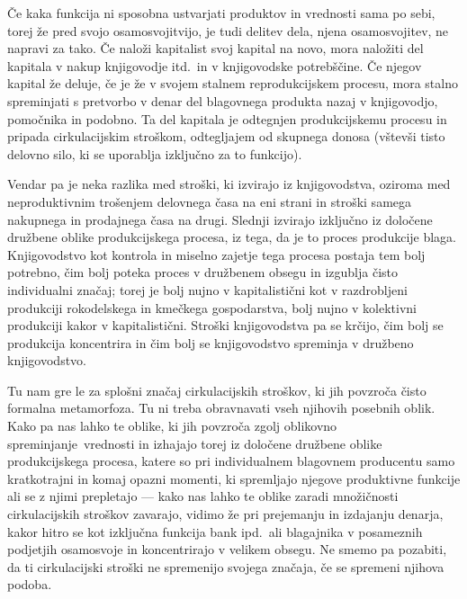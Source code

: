 \documentclass[kapital_02.tex]{subfiles}
\begin{document}
Če kaka funkcija ni sposobna ustvarjati produktov in vrednosti sama po sebi, torej že pred svojo osamosvojitvijo, je tudi delitev dela, njena osamosvojitev, ne napravi za tako.
Če naloži kapitalist svoj kapital na novo, mora naložiti del kapitala v nakup knjigovodje itd.\ in v knjigovodske potrebščine.
Če njegov kapital že deluje, če je že v svojem stalnem reprodukcijskem procesu, mora stalno spreminjati s pretvorbo v denar del blagovnega produkta nazaj v knjigovodjo, pomočnika in podobno.
Ta del kapitala je odtegnjen produkcijskemu procesu in pripada cirkulacijskim stroškom, odtegljajem od skupnega donosa (vštevši tisto delovno silo, ki se uporablja izključno za to funkcijo).

Vendar pa je neka razlika med stroški, ki izvirajo iz knjigovodstva, oziroma med neproduktivnim trošenjem delovnega časa na eni strani in stroški samega nakupnega in prodajnega časa na drugi.
Slednji izvirajo izključno iz določene družbene oblike produkcijskega procesa, iz tega, da je to proces produkcije blaga.
Knjigovodstvo kot kontrola in miselno zajetje tega procesa postaja tem bolj potrebno, čim bolj poteka proces v družbenem obsegu in izgublja čisto individualni značaj; torej je bolj nujno v kapitalistični kot v razdrobljeni produkciji rokodelskega in kmečkega gospodarstva, bolj nujno v kolektivni produkciji kakor v kapitalistični.
Stroški knjigovodstva pa se krčijo, čim bolj se produkcija koncentrira in čim bolj se knjigovodstvo spreminja v družbeno knjigovodstvo.

Tu nam gre le za splošni značaj cirkulacijskih stroškov, ki jih povzroča čisto formalna metamorfoza.
Tu ni treba obravnavati vseh njihovih posebnih oblik.
Kako pa nas lahko te oblike, ki jih povzroča zgolj oblikovno spreminjanje\KPEstran\ vrednosti in izhajajo torej iz določene družbene oblike produkcijskega procesa, katere so pri individualnem blagovnem producentu samo kratkotrajni in komaj opazni momenti, ki spremljajo njegove produktivne funkcije ali se z njimi prepletajo — kako nas lahko te oblike zaradi množičnosti cirkulacijskih stroškov zavarajo, vidimo že pri prejemanju in izdajanju denarja, kakor hitro se kot izključna funkcija bank ipd.\ ali blagajnika v posameznih podjetjih osamosvoje in koncentrirajo v velikem obsegu.
Ne smemo pa pozabiti, da ti cirkulacijski stroški ne spremenijo svojega značaja, če se spremeni njihova podoba. 
\end{document}
